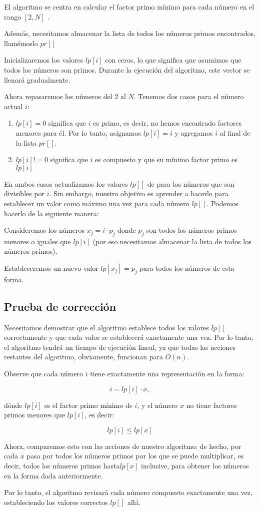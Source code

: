 El algoritmo se centra en calcular el factor primo mínimo para cada número en el rango $[2,N]$ . 

Además, necesitamos almacenar la lista de todos los números primos encontrados, llamémoslo $pr[]$

Inicializaremos los valores $lp[i]$ con ceros, lo que significa que asumimos que todos los números son primos. Durante la ejecución del algoritmo, este vector se llenará gradualmente.

Ahora repasaremos los números del 2 al $N$. Tenemos dos casos para el número actual $i$:

\begin{enumerate}
	\item $lp[i] = 0$ significa que $i$ es primo, es decir, no hemos encontrado factores menores para él. Por lo tanto, asignamos $lp[i]= i$ y agregamos $i$ al final de la lista $pr[]$. 
	\item $lp[i] != 0$ significa que $i$ es compuesto y que su mínimo factor primo es $lp[i]$
\end{enumerate}  

En ambos casos actualizamos los valores $lp[]$ de para los números que son divisibles por $i$. Sin embargo, nuestro objetivo es aprender a hacerlo para establecer un valor como máximo una vez para cada número $lp[]$. Podemos hacerlo de la siguiente manera:

Consideremos los números $x_j = i \cdot p_j$ donde $p_j$ son todos los números primos menores o iguales que $lp [i]$ (por eso necesitamos almacenar la lista de todos los números primos).

Estableceremos un nuevo valor $lp [x_j] = p_j$ para todos los números de esta forma.

\subsection{Prueba de corrección}

Necesitamos demostrar que el algoritmo establece todos los valores $lp[]$ correctamente y que cada valor se establecerá exactamente una vez. Por lo tanto, el algoritmo tendrá un tiempo de ejecución lineal, ya que todas las acciones restantes del algoritmo, obviamente, funcionan para $O(n)$.

Observe que cada número $i$ tiene exactamente una representación en la forma:

$$i = lp [i] \cdot x,$$

dónde $lp[i]$ es el factor primo mínimo de $i$, y el número $x$ no tiene factores primos menores que $lp[i]$, es decir:

$$lp [i] \le lp [x]$$

Ahora, comparemos esto con las acciones de nuestro algoritmo: de hecho, por cada $x$ pasa por todos los números primos por los que se puede multiplicar, es decir, todos los números primos hasta$lp [x]$ inclusive, para obtener los números en la forma dada anteriormente.

Por lo tanto, el algoritmo revisará cada número compuesto exactamente una vez, estableciendo los valores correctos $lp[]$ allá.